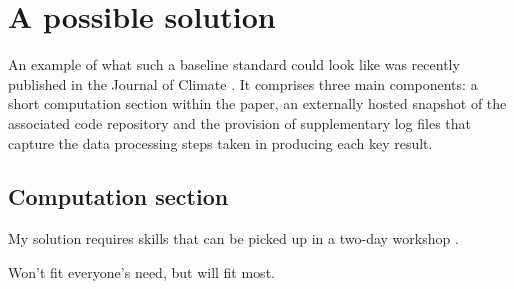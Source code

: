 \section{A possible solution}

An example of what such a baseline standard could look like was recently published in the Journal of Climate \citep{Irving2015}. It comprises three main components: a short computation section within the paper, an externally hosted snapshot of the associated code repository and the provision of supplementary log files that capture the data processing steps taken in producing each key result. 

\subsection{Computation section}





My solution requires skills that can be picked up in a two-day workshop \citep{Wilson2014,Wilson2014a}.

Won't fit everyone's need, but will fit most.